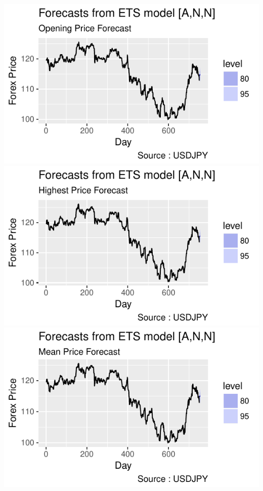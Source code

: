 \documentclass[]{tufte-book}
\begin{document}
\includegraphics{binary-forex-trading-Q1_files/figure-latex/plotETS-1-1}
\includegraphics{binary-forex-trading-Q1_files/figure-latex/plotETS-1-2}
\includegraphics{binary-forex-trading-Q1_files/figure-latex/plotETS-1-3}
\end{document}
